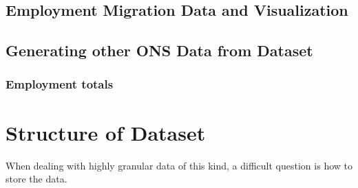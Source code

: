 \documentclass[a4paper,10pt]{article}
\begin{document}
\subsection{Employment Migration Data and Visualization}
\subsection{Generating other ONS Data from Dataset}
\subsubsection{Employment totals}

\section{Structure of Dataset}
When dealing with highly granular data of this kind, a difficult question is how to store the data.
\end{document}
